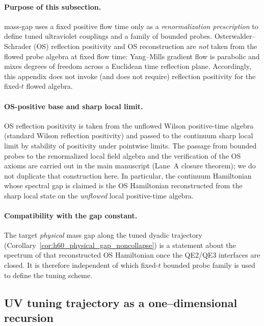 \paragraph{Purpose of this subsection.}
mass-gap uses a fixed positive flow time only as a \emph{renormalization prescription} to define tuned ultraviolet couplings and a family of bounded probes.
Osterwalder--Schrader (OS) reflection positivity and OS reconstruction are \emph{not} taken from the flowed probe algebra at fixed flow time:
Yang--Mills gradient flow is parabolic and mixes degrees of freedom across a Euclidean time reflection plane.
Accordingly, this appendix does not invoke (and does not require) reflection positivity for the fixed-$t$ flowed algebra.

\paragraph{OS-positive base and sharp local limit.}
OS reflection positivity is taken from the unflowed Wilson positive-time algebra (standard Wilson reflection positivity) and passed to the continuum sharp local limit by stability of positivity under pointwise limits.
The passage from bounded probes to the renormalized local field algebra and the verification of the OS axioms are carried out in the main manuscript (Lane~A closure theorem);
we do not duplicate that construction here.
In particular, the continuum Hamiltonian whose spectral gap is claimed is the OS Hamiltonian reconstructed from the sharp local state on the \emph{unflowed} local positive-time algebra.

\paragraph{Compatibility with the gap constant.}
The target \emph{physical} mass gap along the tuned dyadic trajectory (Corollary~\ref{cor:h60_physical_gap_noncollapse}) is a statement about the spectrum of that reconstructed OS Hamiltonian once the QE2/QE3 interfaces are closed.
It is therefore independent of which fixed-$t$ bounded probe family is used to define the tuning scheme.

\subsection{UV tuning trajectory as a one--dimensional recursion}
\label{sec:hardened59_uv_tuning}

